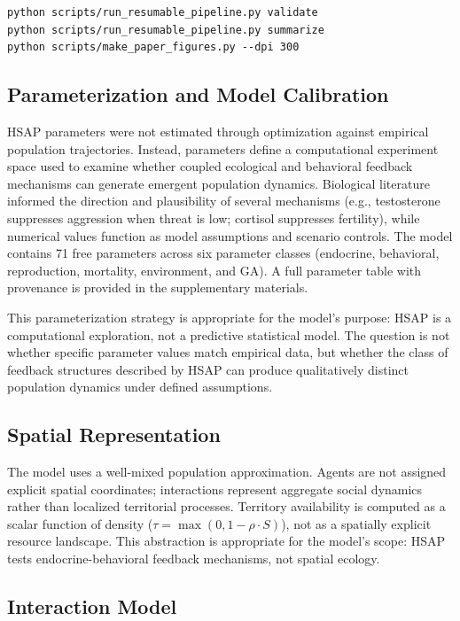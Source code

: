 \begin{verbatim}
python scripts/run_resumable_pipeline.py validate
python scripts/run_resumable_pipeline.py summarize
python scripts/make_paper_figures.py --dpi 300
\end{verbatim}

\subsection{Parameterization and Model Calibration}
\label{sec:parameterization}

HSAP parameters were not estimated through optimization against empirical population trajectories. Instead, parameters define a computational experiment space used to examine whether coupled ecological and behavioral feedback mechanisms can generate emergent population dynamics. Biological literature informed the direction and plausibility of several mechanisms (e.g., testosterone suppresses aggression when threat is low; cortisol suppresses fertility), while numerical values function as model assumptions and scenario controls. The model contains 71 free parameters across six parameter classes (endocrine, behavioral, reproduction, mortality, environment, and GA). A full parameter table with provenance is provided in the supplementary materials.

This parameterization strategy is appropriate for the model's purpose: HSAP is a computational exploration, not a predictive statistical model. The question is not whether specific parameter values match empirical data, but whether the class of feedback structures described by HSAP can produce qualitatively distinct population dynamics under defined assumptions.

\subsection{Spatial Representation}
\label{sec:spatial}

The model uses a well-mixed population approximation. Agents are not assigned explicit spatial coordinates; interactions represent aggregate social dynamics rather than localized territorial processes. Territory availability is computed as a scalar function of density ($\tau = \max(0, 1 - \rho \cdot S)$), not as a spatially explicit resource landscape. This abstraction is appropriate for the model's scope: HSAP tests endocrine-behavioral feedback mechanisms, not spatial ecology.

\subsection{Interaction Model}
\label{sec:interaction}

